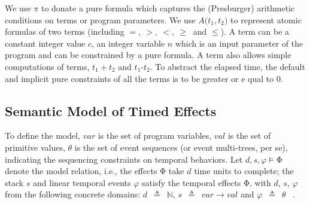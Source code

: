 \documentclass[acmsmall,10pt,review]{acmart}
\newcommand{\es}{\theta}
\newcommand{\effect}{{\ensuremath{\mathrm{\Phi}}}}
\newcommand{\code}[1]{{\tt{\ensuremath{\m{#1}}}}}
\newcommand{\m}{\mathit}
\def\defeq{\ensuremath{\,\triangleq}}
\begin{document}
{We use \code{{\pi}} to donate a pure formula which captures the (Presburger) arithmetic conditions on terms or program parameters. 
We use \code{{A(}{t_1, t_2}{)}} to represent atomic formulas of two terms (including $  {=},
   \ {>},
   \ {<},
   \ {\geq}\ $ and $ {\leq} $).
A term can be a constant integer value \code{c}, an integer variable \code{n} which is an input parameter of the program and can be constrained by a pure formula. 
A term also allows simple computations of terms, \code{t_1{+}t_2} and \code{t_1\text{-}t_2}. To abstract the elapsed time, the default and implicit pure constraints of all the terms is to be greater or e
qual to  0. 


\subsection{Semantic Model of Timed Effects}
\label{subsec:Specification_Semantics}


To define the model, 
\code{var} is the set of program variables, 
\code{val} is the set of primitive values, 
\code{\es} is the set of event sequences (or event multi-trees, per se), 
indicating the sequencing constraints on temporal behaviors.
Let \code{d, s, \varphi \models \effect} denote the model relation, i.e., 
the effects \code{\effect} take \code{d} time units to complete; 
the stack \code{s} and linear temporal events \code{\varphi} satisfy the 
temporal effects \code{\effect}, with \code{d}, \code{s}, \code{\varphi} 
from the following concrete domains: \code{d}  {\defeq}\  \code{\mathbb{N}}, 
\code{s}  \defeq\  \code{var {\rightarrow} val } and \code{\varphi}   \defeq\ \code{\es} \ .



}
\end{document}
